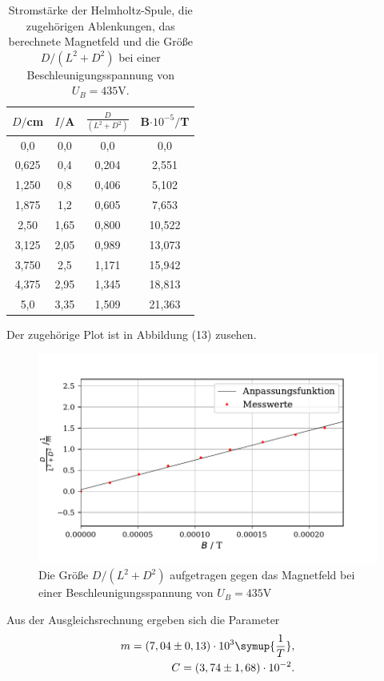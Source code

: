 \begin{table}[H]
  \centering
  \caption{Stromstärke der Helmholtz-Spule, die zugehörigen Ablenkungen, das berechnete Magnetfeld und die Größe $D/(L^2+D^2)$ bei einer Beschleunigungsspannung von $U_B = 435 \si{\volt}$.}
  \label{tab:Parameter}
  \begin{tabular}{c c c c}
    \toprule
    $D/$cm& $I/$A & $\frac{D}{(L^2+D^2)}$ & $ $B$ \cdot 10^{-5} /$T\\
    \bottomrule
    0,0 & 0,0 & 0,0 & 0,0\\
    0,625 & 0,4 & 0,204 & 2,551 \\
    1,250 & 0,8 & 0,406 & 5,102\\
    1,875 & 1,2 & 0,605 & 7,653\\
    2,50 & 1,65 & 0,800 & 10,522\\
    3,125 & 2,05 & 0,989 & 13,073\\
    3,750 & 2,5 & 1,171 & 15,942\\
    4,375 & 2,95 & 1,345 & 18,813\\
    5,0 & 3,35 & 1,509 & 21,363\\
    
     \bottomrule
  \end{tabular}
\end{table}

Der zugehörige Plot ist in Abbildung (13) zusehen.


\begin{figure}[H]
  \centering
  \includegraphics{plot2.pdf}
  \caption{Die Größe $D/(L^2+D^2)$ aufgetragen gegen das Magnetfeld bei einer Beschleunigungsspannung von $U_B = 435\si{\volt}$}
  \label{fig:plot}
\end{figure}

Aus der Ausgleichsrechnung ergeben sich die Parameter
\begin{align*}
    m = (7,04 \pm 0,13) \cdot 10^{3} \symup{\frac{1}{T}},\\
    C = (3,74 \pm 1,68) \cdot 10^{-2} .
\end{align*}

